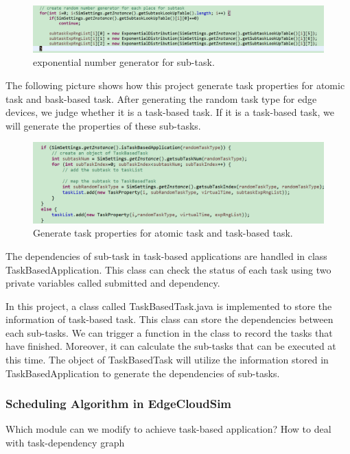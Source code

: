 \begin{figure}
	\centering
	\includegraphics[width=1\textwidth]{./figures/y-1generator.png}
	\caption{\label{fig:frog}exponential number generator for sub-task.}
\end{figure}


The following picture shows how this project generate task properties for atomic task and bask-based task. After generating the random task type for edge devices, we judge whether it is a task-based task. If it is a task-based task, we will generate the properties of these sub-tasks.
\begin{figure}
	\centering
	\includegraphics[width=1\textwidth]{./figures/y-2generator.png}
	\caption{\label{fig:frog}Generate task properties for atomic task and task-based task.}
\end{figure}

The dependencies of sub-task in task-based applications are handled in class TaskBasedApplication. This class can check the status of each task using two private variables called submitted and dependency. 

In this project, a class called TaskBasedTask.java is implemented to store the information of task-based task. This class can store the dependencies between each sub-tasks. We can trigger a function in the class to record the tasks that have finished. Moreover, it can calculate the sub-tasks that can be executed at this time. The object of TaskBasedTask will utilize the information stored in TaskBasedApplication to generate the dependencies of sub-tasks.


\subsubsection{Scheduling Algorithm in EdgeCloudSim}
Which module can we modify to achieve task-based application?
How to deal with task-dependency graph


